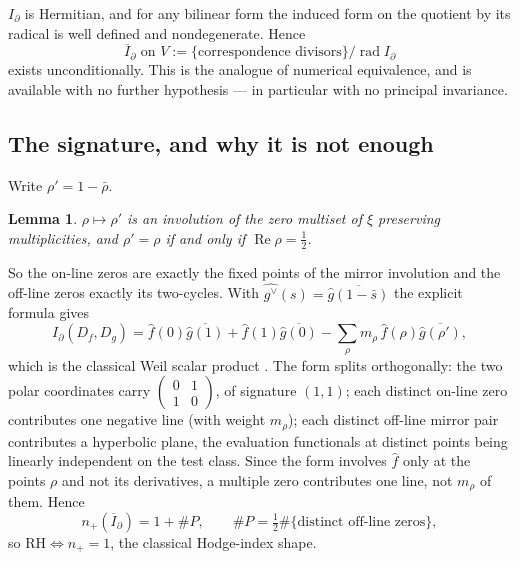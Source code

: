 \documentclass[11pt]{amsart}
\newtheorem{lemma}[theorem]{Lemma}
\theoremstyle{definition}
\theoremstyle{remark}
\newcommand{\RH}{\mathrm{RH}}
\newcommand{\Rel}{\operatorname{Re}}
\begin{document}
$I_\partial$ is Hermitian, and for any bilinear form the induced form on the
quotient by its radical is well defined and nondegenerate.  Hence
\begin{equation}
 \overline I_\partial \text{ on } V:=\{\text{correspondence divisors}\}/
 \operatorname{rad}I_\partial
\end{equation}
exists unconditionally.  This is the analogue of numerical equivalence, and
is available with no further hypothesis --- in particular with no principal
invariance.

\subsection{The signature, and why it is not enough}

Write $\rho'=1-\bar\rho$.

\begin{lemma}\label{lem:mirror}
$\rho\mapsto\rho'$ is an involution of the zero multiset of $\xi$ preserving
multiplicities, and $\rho'=\rho$ if and only if $\Rel\rho=\tfrac12$.
\end{lemma}

So the on-line zeros are exactly the fixed points of the mirror involution
and the off-line zeros exactly its two-cycles.  With
$\widehat{g^\vee}(s)=\overline{\widehat g(1-\bar s)}$ the explicit
formula gives
\begin{equation}\label{eq:evalcoords}
 I_\partial(D_f,D_g)=
 \widehat f(0)\overline{\widehat g(1)}+\widehat f(1)\overline{\widehat g(0)}
 -\sum_\rho m_\rho\,\widehat f(\rho)\overline{\widehat g(\rho')},
\end{equation}
which is the classical Weil scalar product \cite{Lagarias2007}.  The form
splits orthogonally: the two polar coordinates carry
$\left(\begin{smallmatrix}0&1\\1&0\end{smallmatrix}\right)$, of signature
$(1,1)$; each distinct on-line zero contributes one negative line (with
weight $m_\rho$); each distinct off-line mirror pair contributes a
hyperbolic plane, the evaluation functionals at distinct points being
linearly independent on the test class.  Since the form involves
$\widehat f$ only at the points $\rho$ and not its derivatives, a multiple
zero contributes one line, not $m_\rho$ of them.  Hence
\begin{equation}
 n_+(\overline I_\partial)=1+\#P,\qquad
 \#P=\tfrac12\#\{\text{distinct off-line zeros}\},
\end{equation}
so $\RH\iff n_+=1$, the classical Hodge-index shape.
\end{document}

